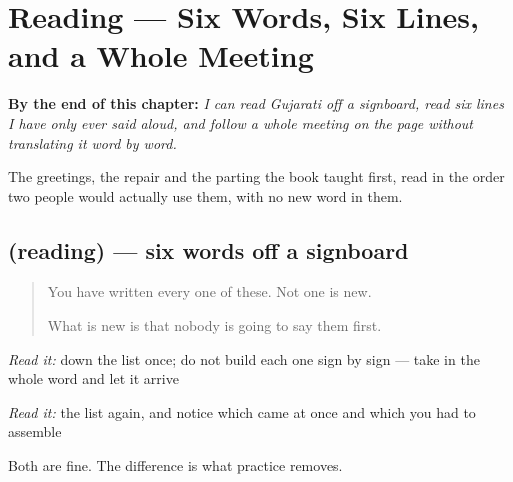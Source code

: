 
\chapter{Reading — Six Words, Six Lines, and a Whole Meeting}
\label{ch:gu-pehli-vanchan}

\begin{chapteropening}
\textbf{By the end of this chapter:} \emph{I can read Gujarati off a signboard, read six lines I have only ever said aloud, and follow a whole meeting on the page without translating it word by word.}

The greetings, the repair and the parting the book taught first, read in the order two people would actually use them, with no new word in them.
\end{chapteropening}

\section[(reading)]{(reading) — six words off a signboard}

\label{lesson:GU-C44-words}



\begin{quote}
You have written every one of these. Not one is new.

What is new is that nobody is going to say them first.
\end{quote}

\begin{tcolorbox}[breakable,skin=enhanced,colback=orange!6,colframe=orange!45!black,boxrule=0.5pt,arc=1mm,left=6pt,right=6pt,top=4pt,bottom=4pt,fonttitle=\bfseries,title={Read this}]
\begin{quote}
     
\end{quote}

\emph{Read it:} down the list once; do not build each one sign by sign — take in the whole word and let it arrive

\emph{Read it:} the list again, and notice which came at once and which you had to assemble

Both are fine. The difference is what practice removes.
\end{tcolorbox}


